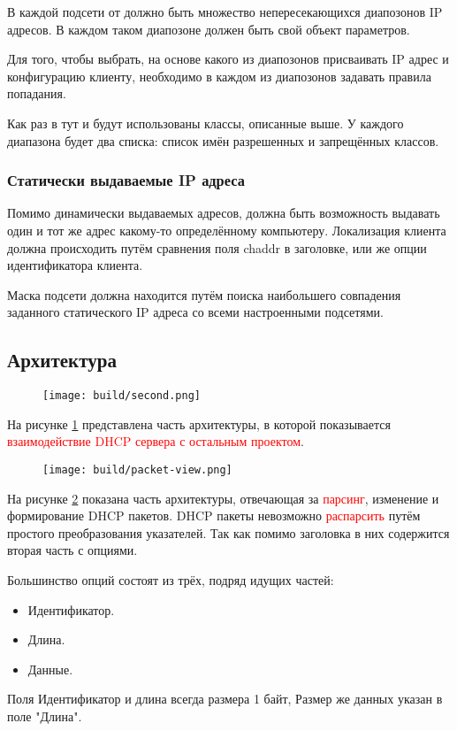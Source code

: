\documentclass[14pt]{extarticle}
\begin{document}
В каждой подсети от должно быть множество непересекающихся диапозонов IP адресов. В каждом таком диапозоне должен быть свой объект параметров.

Для того, чтобы выбрать, на основе какого из диапозонов присваивать IP адрес и конфигурацию клиенту, необходимо в каждом из диапозонов задавать правила попадания.

Как раз в тут и будут использованы классы, описанные выше.
У каждого диапазона будет два списка: список имён разрешенных и запрещённых классов.

\subsubsection{Статически выдаваемые IP адреса}

Помимо динамически выдаваемых адресов, должна быть возможность выдавать один и тот же адрес какому-то определённому компьютеру.
Локализация клиента должна происходить путём сравнения поля chaddr в заголовке, или же опции идентификатора клиента.

Маска подсети должна находится путём поиска наибольшего совпадения заданного статического IP адреса со всеми настроенными подсетями.


\pagebreak
\subsection{Архитектура}

\begin{figure}[H]
    \texttt{[image: build/second.png]}
    \caption{}
    \label{fig:arch}
\end{figure}

На рисунке \ref{fig:arch} представлена часть архитектуры, в которой показывается \textcolor{red}{взаимодействие DHCP сервера с остальным проектом}.

\begin{figure}[H]
    \texttt{[image: build/packet-view.png]}
    \caption{}
    \label{fig:packet-view}
\end{figure}

На рисунке \ref{fig:packet-view} показана часть архитектуры, отвечающая за \textcolor{red}{парсинг}, изменение и формирование DHCP пакетов. DHCP пакеты невозможно \textcolor{red}{распарсить} путём простого преобразования указателей. Так как помимо заголовка в них содержится вторая часть с опциями.

Большинство опций состоят из трёх, подряд идущих частей:
\begin{itemize}
    \item Идентификатор.
    \item Длина.
    \item Данные.
\end{itemize}
Поля Идентификатор и длина всегда размера 1 байт, Размер же данных указан в поле "Длина".
\end{document}

